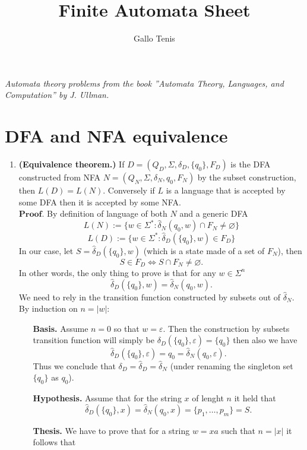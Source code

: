 \documentclass{article}
\title{Finite Automata Sheet}
\author{Gallo Tenis}
\newcommand{\D}{
    \hat{\delta}_{D}
}
\newcommand{\N}{
    \hat{\delta}_{N}
}
\newcommand{\DD}[2]{
    \hat{\delta}_{D}(\{#1\}, #2)
}
\newcommand{\NN}[2]{
    \hat{\delta}_{N}(#1, #2)
}
\theoremstyle{remark}
\begin{document}
\maketitle

\begin{center}
    \textit{
        Automata theory problems from the book ''Automata Theory, Languages, and Computation'' by J. Ullman.
    }
\end{center}
\section*{DFA and NFA equivalence}
\begin{enumerate}
    \item \textbf{(Equivalence theorem.)}
    If \( D = (Q_D, \Sigma, \delta_D, \{q_0\}, F_D) \) is the DFA constructed from NFA 
    \( N = (Q_N, \Sigma, \delta_N, q_0, F_N) \) by the subset construction, then \( L(D) = L(N) \).
    Conversely if $L$ is a language that is accepted by some DFA then it is accepted by some NFA.
    \\$\textbf{Proof.}$
    By definition of language of both $N$ and a generic DFA
    \[
    L(N) := \{w \in \Sigma^* : \hat{\delta}_N(q_0,w) \cap F_N \neq \varnothing\}
    \]
    \[
    L(D) := \{w \in \Sigma^* : \hat{\delta}_D(\{q_0\},w) \in F_D\}
    \]
    In our case, let $S = \DD{q_0}{w}$ (which is a state made of a set of $F_N$), then
    \[
    S \in F_D \iff S \cap F_N \neq \varnothing.
    \]
    In other words, the only thing to prove is that for any $w \in \Sigma^n$
    \[
        \DD{q_0}{w} = \NN{q_0}{w}.
    \]
    We need to rely in the transition function constructed by subsets out of $\N$.
    By induction on $n = \vert w \vert$:
    \begin{enumerate}
        \item[\textbf{Basis.}] Assume $n = 0$ so that $w = \varepsilon$. Then 
        the construction by subsets transition function will simply be $\delta_D(\{q_0\},\varepsilon) = \{q_0\}$ then 
        also we have
        \[
        \DD{q_0}{\varepsilon} = q_0 = \NN{q_0}{\varepsilon}.
        \]
        Thus we conclude that $\delta_D = \D = \N$ (under renaming the singleton set $\{q_0\}$ as $q_0$).
        \item[\textbf{Hypothesis.}] Assume that for the string $x$ of lenght $n$ it held that 
        \[
        \DD{q_0}{x} = \NN{q_0}{x} = \{p_1,\dots, p_m\} = S.
        \]
        \item[\textbf{Thesis.}] We have to prove that for a string $w = xa$ such that $n = \vert x\vert$ it follows that 

\end{enumerate}
\end{enumerate}
\end{document}
